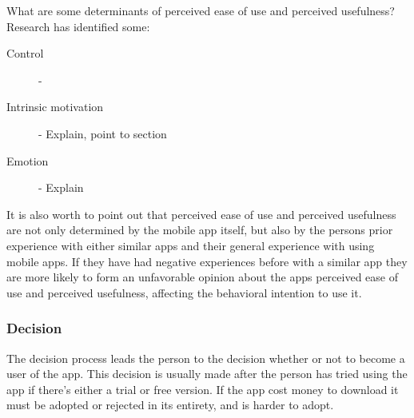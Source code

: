 What are some determinants of perceived ease of use and perceived usefulness? Research has identified some:
\begin{description}
  \item[Control] -
  \item[Intrinsic motivation] - Explain, point to section
  \item[Emotion] - Explain
\end{description}

It is also worth to point out that perceived ease of use and perceived usefulness are not only determined by the mobile app itself, but also by the persons prior experience with either similar apps and their general experience with using mobile apps. If they have had negative experiences before with a similar app they are more likely to form an unfavorable opinion about the apps perceived ease of use and perceived usefulness, affecting the behavioral intention to use it.

\subsubsection{Decision}
The decision process leads the person to the decision whether or not to become a user of the app. This decision is usually made after the person has tried using the app if there's either a trial or free version. If the app cost money to download it must be adopted or rejected in its entirety, and is harder to adopt.


